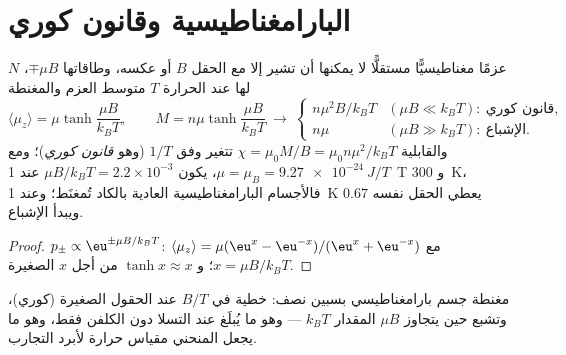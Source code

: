 \section{البارامغناطيسية وقانون كوري}

\begin{proposition}\label{prop:b2:boltzmann-factor:curie}
$N$ عزمًا مغناطيسيًّا مستقلًّا لا يمكنها أن تشير إلا مع الحقل $B$ أو
عكسه، وطاقاتها $\mp\mu B$، لها عند الحرارة $T$ متوسط
العزم والمغنطة
\[
\langle\mu_z\rangle = \mu\tanh\frac{\mu B}{k_BT}, \qquad
M = n\mu\tanh\frac{\mu B}{k_BT}
\ \longrightarrow\
\begin{cases} n\mu^2B/k_BT & (\mu B \ll k_BT):\ \text{قانون كوري}, \\ n\mu & (\mu B \gg k_BT):\ \text{الإشباع}. \end{cases}
\]
والقابلية $\chi = \mu_0M/B = \mu_0n\mu^2/k_BT$ تتغير وفق $1/T$
(وهو \emph{قانون كوري})؛ ومع $\mu = \mu_B = \qty{9.27e-24}{J/T}$،
يكون $\mu B/k_BT = 2.2 \times 10^{-3}$ عند \qty{1}{T} و \qty{300}{K}، فالأجسام
البارامغناطيسية العادية بالكاد تُمغنَط؛ وعند \qty{1}{K} يعطي الحقل نفسه
$0.67$ ويبدأ الإشباع.
\end{proposition}

\begin{proof}
$p_\pm \propto\eu^{\pm\mu B/k_BT}$: $\langle\mu_z\rangle = \mu(\eu^x - \eu^{-x})/(\eu^x +
\eu^{-x})$ مع $x = \mu B/k_BT$؛ و $\tanh x \approx x$ من أجل $x$ الصغيرة.
\end{proof}

\begin{omfigure}

{\small مغنطة جسم بارامغناطيسي بسبين نصف: خطية في $B/T$ عند
الحقول الصغيرة (كوري)، وتشبع حين يتجاوز $\mu B$ المقدار $k_BT$ --- وهو ما يُبلَغ
عند التسلا دون الكلفن فقط، وهو ما يجعل المنحني مقياس حرارة
لأبرد التجارب.}
\end{omfigure}

